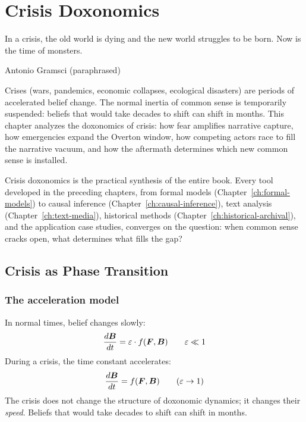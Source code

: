 \chapter{Crisis Doxonomics}
\label{ch:crisis-doxonomics}

\epigraph{In a crisis, the old world is dying and the new world struggles to be born. Now is the time of monsters.}{Antonio Gramsci (paraphrased)}

\noindent
Crises (wars, pandemics, economic collapses, ecological disasters) are periods of accelerated belief change.
The normal inertia of common sense is temporarily suspended: beliefs that would take decades to shift can shift in months.
This chapter analyzes the doxonomics of crisis: how fear amplifies narrative capture, how emergencies expand the Overton window, how competing actors race to fill the narrative vacuum, and how the aftermath determines which new common sense is installed.

Crisis doxonomics is the practical synthesis of the entire book.
Every tool developed in the preceding chapters, from formal models (Chapter~\ref{ch:formal-models}) to causal inference (Chapter~\ref{ch:causal-inference}), text analysis (Chapter~\ref{ch:text-media}), historical methods (Chapter~\ref{ch:historical-archival}), and the application case studies, converges on the question: when common sense cracks open, what determines what fills the gap?

\section{Crisis as Phase Transition}
\label{sec:ch29-phase}

\subsection{The acceleration model}

\begin{model}
\label{mod:crisis}
In normal times, belief changes slowly:
\[
  \frac{d\bm{B}}{dt} = \varepsilon \cdot f(\bm{F}, \bm{B}) \qquad \varepsilon \ll 1
\]
During a crisis, the time constant accelerates:
\[
  \frac{d\bm{B}}{dt} = f(\bm{F}, \bm{B}) \qquad (\varepsilon \to 1)
\]
The crisis does not change the structure of doxonomic dynamics; it changes their \emph{speed}.
Beliefs that would take decades to shift can shift in months.
\end{model}

